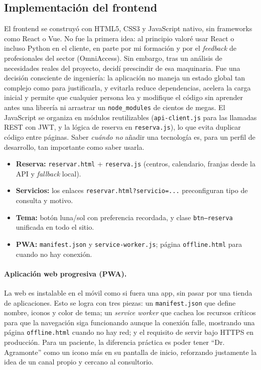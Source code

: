 \documentclass[12pt,a4paper]{report}
\begin{document}
\subsection{Implementación del frontend}

El frontend se construyó con HTML5, CSS3 y JavaScript nativo, sin frameworks como React o Vue. No fue la primera idea: al principio valoré usar React o incluso Python en el cliente, en parte por mi formación y por el \emph{feedback} de profesionales del sector (OmniAccess). Sin embargo, tras un análisis de necesidades reales del proyecto, decidí prescindir de esa maquinaria. Fue una decisión consciente de ingeniería: la aplicación no maneja un estado global tan complejo como para justificarla, y evitarla reduce dependencias, acelera la carga inicial y permite que cualquier persona lea y modifique el código sin aprender antes una librería ni arrastrar un \texttt{node\_modules} de cientos de megas. El JavaScript se organiza en módulos reutilizables (\texttt{api-client.js} para las llamadas REST con JWT, y la lógica de reserva en \texttt{reserva.js}), lo que evita duplicar código entre páginas. Saber \emph{cuándo no} añadir una tecnología es, para un perfil de desarrollo, tan importante como saber usarla.

\begin{itemize}
  \item \textbf{Reserva:} \texttt{reservar.html} + \texttt{reserva.js} (centros, calendario, franjas desde la API y \emph{fallback} local).
  \item \textbf{Servicios:} los enlaces \texttt{reservar.html?servicio=...} preconfiguran tipo de consulta y motivo.
  \item \textbf{Tema:} botón luna/sol con preferencia recordada, y clase \texttt{btn--reserva} unificada en todo el sitio.
  \item \textbf{PWA:} \texttt{manifest.json} y \texttt{service-worker.js}; página \texttt{offline.html} para cuando no hay conexión.
\end{itemize}

\paragraph{Aplicación web progresiva (PWA).} La web es instalable en el móvil como si fuera una app, sin pasar por una tienda de aplicaciones. Esto se logra con tres piezas: un \texttt{manifest.json} que define nombre, iconos y color de tema; un \emph{service worker} que cachea los recursos críticos para que la navegación siga funcionando aunque la conexión falle, mostrando una página \texttt{offline.html} cuando no hay red; y el requisito de servir bajo HTTPS en producción. Para un paciente, la diferencia práctica es poder tener ``Dr. Agramonte'' como un icono más en su pantalla de inicio, reforzando justamente la idea de un canal propio y cercano al consultorio.
\end{document}
